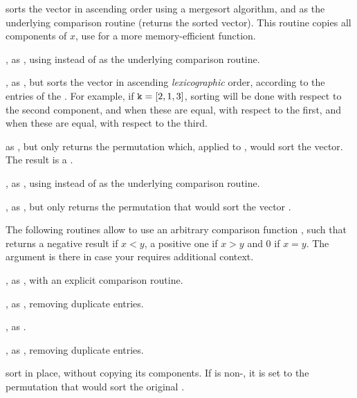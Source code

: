 
 sorts the vector  in ascending order using a
mergesort algorithm, and  as the underlying comparison routine
(returns the sorted vector). This routine copies all components of $x$, use
 for a more memory-efficient function.

, as , using  instead of
 as the underlying comparison routine.

, as , but sorts the
vector  in ascending \emph{lexicographic} order, according to the
entries of the  . For example,  if ${\tt k} = [2,1,3]$,
sorting will be done with respect to the second component,  and when these
are  equal, with respect to the first,  and when these are equal,  with
respect to the third.


 as , but only returns the permutation
which, applied to , would sort the vector. The result is a
.

, as , using 
instead of  as the underlying comparison routine.

, as , but only
returns the permutation that would sort the vector .

 The following routines allow to use an
arbitrary comparison function ,
such that  returns a negative result if $x
< y$, a positive one if $x > y$ and 0 if $x = y$. The  argument is
there in case your  requires additional context.

, as
, with an explicit comparison routine.

, as
, removing duplicate entries.

,
as .

,
as , removing duplicate entries.

 sort  in place, without copying its components. If
 is non-, it is set to the permutation that would sort
the original .

